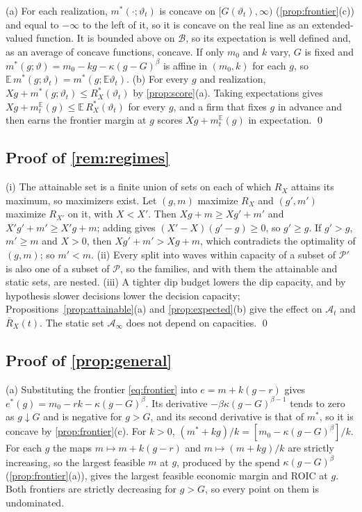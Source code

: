 (a) For each realization, $m^*(\cdot;\vartheta_t)$ is concave on $[G(\vartheta_t),\infty)$ (\autoref{prop:frontier}(c)) and equal to $-\infty$ to the left of it, so it is concave on the real line as an extended-valued function. It is bounded above on $\mathcal B$, so its expectation is well defined and, as an average of concave functions, concave. If only $m_0$ and $k$ vary, $G$ is fixed and $m^*(g;\vartheta)=m_0-kg-\kappa(g-G)^{\beta}$ is affine in $(m_0,k)$ for each $g$, so $\mathbb E\,m^*(g;\vartheta_t)=m^*(g;\mathbb E\vartheta_t)$. (b) For every $g$ and realization, $Xg+m^*(g;\vartheta_t)\le R^*_X(\vartheta_t)$ by \autoref{prop:score}(a). Taking expectations gives $Xg+m^{\mathbb E}_t(g)\le\mathbb E\,R^*_X(\vartheta_t)$ for every $g$, and a firm that fixes $g$ in advance and then earns the frontier margin at $g$ scores $Xg+m^{\mathbb E}_t(g)$ in expectation. \qed

\subsection*{Proof of \autoref{rem:regimes}}

(i) The attainable set is a finite union of sets on each of which $R_X$ attains its maximum, so maximizers exist. Let $(g,m)$ maximize $R_X$ and $(g',m')$ maximize $R_{X'}$ on it, with $X<X'$. Then $Xg+m\ge Xg'+m'$ and $X'g'+m'\ge X'g+m$; adding gives $(X'-X)(g'-g)\ge0$, so $g'\ge g$. If $g'>g$, $m'\ge m$ and $X>0$, then $Xg'+m'>Xg+m$, which contradicts the optimality of $(g,m)$; so $m'<m$. (ii) Every split into waves within capacity of a subset of $\mathcal P'$ is also one of a subset of $\mathcal P$, so the families, and with them the attainable and static sets, are nested. (iii) A tighter dip budget lowers the dip capacity, and by hypothesis slower decisions lower the decision capacity; Propositions~\ref{prop:attainable}(a) and \ref{prop:expected}(b) give the effect on $\mathcal A_t$ and $\bar R_X(t)$. The static set $\mathcal A_\infty$ does not depend on capacities. \qed

\subsection*{Proof of \autoref{prop:general}}

(a) Substituting the frontier \eqref{eq:frontier} into $e=m+k(g-r)$ gives $e^*(g)=m_0-rk-\kappa(g-G)^{\beta}$. Its derivative $-\beta\kappa(g-G)^{\beta-1}$ tends to zero as $g\downarrow G$ and is negative for $g>G$, and its second derivative is that of $m^*$, so it is concave by \autoref{prop:frontier}(c). For $k>0$, $(m^*+kg)/k=[m_0-\kappa(g-G)^{\beta}]/k$. For each $g$ the maps $m\mapsto m+k(g-r)$ and $m\mapsto(m+kg)/k$ are strictly increasing, so the largest feasible $m$ at $g$, produced by the spend $\kappa(g-G)^{\beta}$ (\autoref{prop:frontier}(a)), gives the largest feasible economic margin and ROIC at $g$. Both frontiers are strictly decreasing for $g>G$, so every point on them is undominated.

